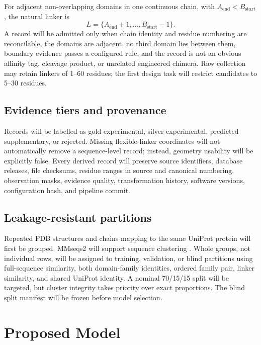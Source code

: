 \documentclass[10pt,a4paper]{article}
\begin{document}
For adjacent non-overlapping domains in one continuous chain, with $A_{\mathrm{end}} < B_{\mathrm{start}}$, the natural linker is
\begin{equation}
  L = \{A_{\mathrm{end}}+1,\ldots,B_{\mathrm{start}}-1\}.
\end{equation}
A record will be admitted only when chain identity and residue numbering are reconcilable, the domains are adjacent, no third domain lies between them, boundary evidence passes a configured rule, and the record is not an obvious affinity tag, cleavage product, or unrelated engineered chimera. Raw collection may retain linkers of 1--60 residues; the first design task will restrict candidates to 5--30 residues.

\subsection{Evidence tiers and provenance}

Records will be labelled as gold experimental, silver experimental, predicted supplementary, or rejected. Missing flexible-linker coordinates will not automatically remove a sequence-level record; instead, geometry usability will be explicitly false. Every derived record will preserve source identifiers, database releases, file checksums, residue ranges in source and canonical numbering, observation masks, evidence quality, transformation history, software versions, configuration hash, and pipeline commit.

\subsection{Leakage-resistant partitions}

Repeated PDB structures and chains mapping to the same UniProt protein will first be grouped. MMseqs2 will support sequence clustering \citep{steinegger2017}. Whole groups, not individual rows, will be assigned to training, validation, or blind partitions using full-sequence similarity, both domain-family identities, ordered family pair, linker similarity, and shared UniProt identity. A nominal 70/15/15 split will be targeted, but cluster integrity takes priority over exact proportions. The blind split manifest will be frozen before model selection.

\section{Proposed Model}
\end{document}

